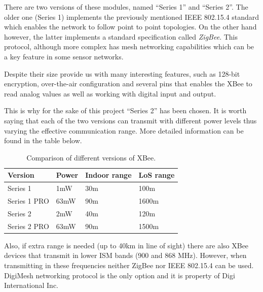 There are two versions of these modules, named ``Series 1'' and ``Series 2''. The older one (Series 1) implements the previously mentioned IEEE 802.15.4 standard which enables the network to follow point to point topologies. On the other hand however, the latter implements a standard specification called \emph{ZigBee}. This protocol, although more complex has mesh networking capabilities which can be a key feature in some sensor networks.

Despite their size provide us with many interesting features, such as 128-bit encryption, over-the-air configuration and several pins that enables the XBee to read analog values as well as working with digital input and output\citep{xbeedatasheet}.

This is why for the sake of this project ``Series 2'' has been chosen. It is worth saying that each of the two versions can transmit with different power levels thus varying the effective communication range\citep{faludi2010building}. More detailed information can be found in the table below.

\begin{table}[ht] 
\centering
\begin{tabular}{l l l l}
    Version     & Power                 & Indoor range     & LoS range\footnotemark[1]\\
\hline
Series 1        & 1mW                   & 30m              & 100m\\
Series 1 PRO    & 63mW\footnotemark[2]  & 90m              & 1600m\\
Series 2        & 2mW                   & 40m              & 120m\\
Series 2 PRO    & 63mW\footnotemark[2]  & 90m              & 1500m\\
\end{tabular}
\caption{Comparison of different versions of XBee\textregistered.}
\end{table}


Also, if extra range is needed (up to 40km in line of sight) there are also XBee\textregistered{} devices that transmit in lower ISM bands (900 and 868 MHz). However, when transmitting in these frequencies neither ZigBee nor IEEE 802.15.4 can be used. DigiMesh\texttrademark{} networking protocol is the only option and it is property of Digi International Inc.


